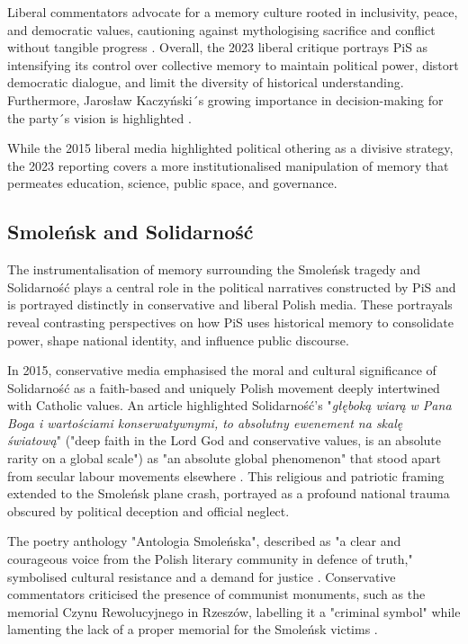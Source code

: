 Liberal commentators advocate for a memory culture rooted in inclusivity, peace, and democratic values, cautioning against mythologising sacrifice and conflict without tangible progress \citep{liliental_przerazmnie_2023}. Overall, the 2023 liberal critique portrays PiS as intensifying its control over collective memory to maintain political power, distort democratic dialogue, and limit the diversity of historical understanding. Furthermore, Jarosław Kaczyński´s growing importance in decision-making for the party´s vision is highlighted \citep{okopress2023lists}. 

While the 2015 liberal media highlighted political othering as a divisive strategy, the 2023 reporting covers a more institutionalised manipulation of memory that permeates education, science, public space, and governance.


\subsection{Smoleńsk and Solidarność}

The instrumentalisation of memory surrounding the Smoleńsk tragedy and Solidarność plays a central role in the political narratives constructed by PiS and is portrayed distinctly in conservative and liberal Polish media. These portrayals reveal contrasting perspectives on how PiS uses historical memory to consolidate power, shape national identity, and influence public discourse.

In 2015, conservative media emphasised the moral and cultural significance of Solidarność as a faith-based and uniquely Polish movement deeply intertwined with Catholic values. An article highlighted Solidarność’s "\textit{głęboką wiarą w Pana Boga i wartościami konserwatywnymi, to absolutny ewenement na skalę światową}" ("deep faith in the Lord God and conservative values, is an absolute rarity on a global scale") \citep{wpolityce_solidarnosc_2015} as "an absolute global phenomenon" that stood apart from secular labour movements elsewhere \citep{wpolityce_solidarnosc_2015}. This religious and patriotic framing extended to the Smoleńsk plane crash, portrayed as a profound national trauma obscured by political deception and official neglect.

The poetry anthology "Antologia Smoleńska", described as "a clear and courageous voice from the Polish literary community in defence of truth," symbolised cultural resistance and a demand for justice \citep{wpolityce_antologia_2015}. Conservative commentators criticised the presence of communist monuments, such as the memorial Czynu Rewolucyjnego in Rzeszów, labelling it a "criminal symbol" while lamenting the lack of a proper memorial for the Smoleńsk victims \citep{wpolityce_historyk_2015}.

